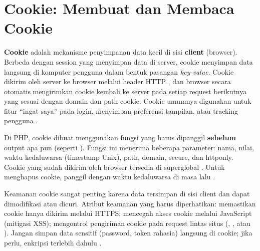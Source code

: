 ﻿\section{Cookie: Membuat dan Membaca Cookie}

\textbf{Cookie} adalah mekanisme penyimpanan data kecil di sisi \textbf{client} (browser). Berbeda dengan session yang menyimpan data di server, cookie menyimpan data langsung di komputer pengguna dalam bentuk pasangan \textit{key-value}. Cookie dikirim oleh server ke browser melalui header HTTP , dan browser secara otomatis mengirimkan cookie kembali ke server pada setiap request berikutnya yang sesuai dengan domain dan path cookie. Cookie umumnya digunakan untuk fitur ``ingat saya'' pada login, menyimpan preferensi tampilan, atau tracking pengguna \cite{phpManual}.

Di PHP, cookie dibuat menggunakan fungsi  yang harus dipanggil \textbf{sebelum} output apa pun (seperti ). Fungsi ini menerima beberapa parameter: nama, nilai, waktu kedaluwarsa (timestamp Unix), path, domain, secure, dan httponly. Cookie yang sudah dikirim oleh browser tersedia di superglobal . Untuk menghapus cookie, panggil  dengan waktu kedaluwarsa di masa lalu \cite{phpRightWay}.


Keamanan cookie sangat penting karena data tersimpan di sisi client dan dapat dimodifikasi atau dicuri. Atribut keamanan yang harus diperhatikan:  memastikan cookie hanya dikirim melalui HTTPS;  mencegah akses cookie melalui JavaScript (mitigasi XSS);  mengontrol pengiriman cookie pada request lintas situs (, , atau ). Jangan simpan data sensitif (password, token rahasia) langsung di cookie; jika perlu, enkripsi terlebih dahulu \cite{owaspXss}.


